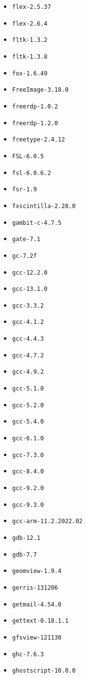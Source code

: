 \begin{itemize}
\item \verb|flex-2.5.37|
\item \verb|flex-2.6.4|
\item \verb|fltk-1.3.2|
\item \verb|fltk-1.3.8|
\item \verb|fox-1.6.49|
\item \verb|FreeImage-3.18.0|
\item \verb|freerdp-1.0.2|
\item \verb|freerdp-1.2.0|
\item \verb|freetype-2.4.12|
\item \verb|FSL-6.0.5|
\item \verb|fsl-6.0.6.2|
\item \verb|fsr-1.9|
\item \verb|fxscintilla-2.28.0|
\item \verb|gambit-c-4.7.5|
\item \verb|gate-7.1|
\item \verb|gc-7.2f|
\item \verb|gcc-12.2.0|
\item \verb|gcc-13.1.0|
\item \verb|gcc-3.3.2|
\item \verb|gcc-4.1.2|
\item \verb|gcc-4.4.3|
\item \verb|gcc-4.7.2|
\item \verb|gcc-4.9.2|
\item \verb|gcc-5.1.0|
\item \verb|gcc-5.2.0|
\item \verb|gcc-5.4.0|
\item \verb|gcc-6.1.0|
\item \verb|gcc-7.3.0|
\item \verb|gcc-8.4.0|
\item \verb|gcc-9.2.0|
\item \verb|gcc-9.3.0|
\item \verb|gcc-arm-11.2.2022.02|
\item \verb|gdb-12.1|
\item \verb|gdb-7.7|
\item \verb|geomview-1.9.4|
\item \verb|gerris-131206|
\item \verb|getmail-4.54.0|
\item \verb|gettext-0.18.1.1|
\item \verb|gfsview-121130|
\item \verb|ghc-7.6.3|
\item \verb|ghostscript-10.0.0|

\end{itemize}
